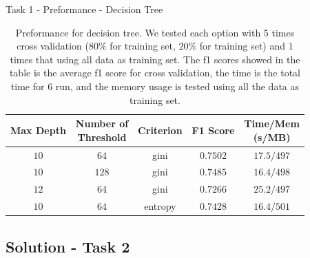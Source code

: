 \documentclass{beamer}
\begin{document}
\begin{frame}{Task 1 - Preformance - Decision Tree}

  \begin{table}[H]
    \centering
    \begin{tabular}{|c|c|c|c|c|}
      \hline
      Max Depth & \makecell{Number of                                   \\ Threshold} & Criterion & F1 Score & \makecell{Time/Mem \\ (s/MB)}               \\
      \hline
      $10$      & $64$                & gini    & $0.7502$ & $17.5/497$ \\
      \hline
      $10$      & $128$               & gini    & $0.7485$ & $16.4/498$ \\
      \hline
      $12$      & $64$                & gini    & $0.7266$ & $25.2/497$ \\
      \hline
      $10$      & $64$                & entropy & $0.7428$ & $16.4/501$ \\
      \hline
    \end{tabular}
    \caption{Preformance for decision tree. We tested each option with $5$ times cross validation ($80\%$ for training set, $20\%$ for training set) and $1$ times that using all data as training set. The f1 scores showed in the table is the average f1 score for cross validation, the time is the total time for $6$ run, and the memory usage is tested using all the data as training set.}
  \end{table}

\end{frame}

\subsection{Solution - Task 2}
\end{document}
